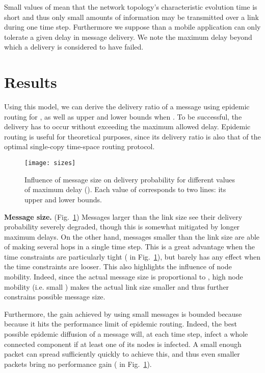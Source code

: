 \documentclass{sig-alt-release2}
\begin{document}
Small values of  mean that the network topology's
characteristic evolution time is short and thus only small amounts
of information may be transmitted over a link during one time
step. Furthermore we suppose than a mobile application can only
tolerate a given delay in message delivery. We note  the maximum
delay beyond which a delivery is considered to have failed. 

\section{Results}
\label{sec:results}
Using this model, we can derive the delivery ratio of a message using
epidemic routing for , as well as upper and lower bounds
when . To be successful, the delivery has to occur without
exceeding the maximum allowed delay. Epidemic routing is useful for
theoretical purposes, since its delivery ratio is also that of the
optimal single-copy time-space routing protocol.

\begin{figure}[t]
  \centering
  \texttt{[image: sizes]}
  \caption{Influence of message size on delivery probability for
    different values of maximum delay (). Each value of 
    corresponds to two lines: its upper and lower bounds.}
  \label{param_size}
\end{figure}

\vspace{1mm}
\noindent\textbf{Message size.} (Fig.~\ref{param_size}) Messages
larger than the link size see their delivery probability severely
degraded, though this is somewhat mitigated by longer maximum
delays. On the other hand, messages smaller than the link size are
able of making several hops in a single time step. This is a great
advantage when the time constraints are particularly tight ( in
Fig.~\ref{param_size}), but barely has any effect when the time
constraints are looser. This also highlights the influence of node
mobility. Indeed, since the actual message size is proportional to
, high node mobility (i.e. small ) makes the actual link
size smaller and thus further constrains possible message size.

Furthermore, the gain achieved by using small messages is bounded
because because it hits the performance limit of epidemic
routing. Indeed, the best possible epidemic diffusion of a message
will, at each time step, infect a whole connected component if at
least one of its nodes is infected. A small enough packet can spread
sufficiently quickly to achieve this, and thus even smaller packets
bring no performance gain ( in Fig.~\ref{param_size}).
\end{document}
